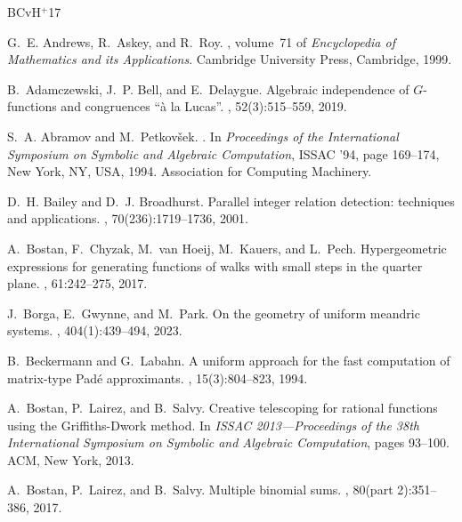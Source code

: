 \documentclass[12pt]{amsart}
\theoremstyle{plain}
\theoremstyle{remark}
\begin{document}
\newcommand{\etalchar}[1]{$^{#1}$}
\begin{thebibliography}{BCvH{\etalchar{+}}17}

G.~E. Andrews, R.~Askey, and R.~Roy.
, volume~71 of {\em Encyclopedia of
  Mathematics and its Applications}.
\newblock Cambridge University Press, Cambridge, 1999.

B.~Adamczewski, J.~P. Bell, and E.~Delaygue.
\newblock Algebraic independence of {$G$}-functions and congruences ``\`a la
  {L}ucas''.
, 52(3):515--559, 2019.

S.~A. Abramov and M.~Petkov\v{s}ek.
.
\newblock In {\em Proceedings of the International Symposium on Symbolic and
  Algebraic Computation}, ISSAC '94, page 169–174, New York, NY, USA, 1994.
  Association for Computing Machinery.

D.~H. Bailey and D.~J. Broadhurst.
\newblock Parallel integer relation detection: techniques and applications.
, 70(236):1719--1736, 2001.

\bibitem[BCvH{\etalchar{+}}17]{BoChHoKaPe17}
A.~Bostan, F.~Chyzak, M.~van Hoeij, M.~Kauers, and L.~Pech.
\newblock Hypergeometric expressions for generating functions of walks with
  small steps in the quarter plane.
, 61:242--275, 2017.

J.~Borga, E.~Gwynne, and M.~Park.
\newblock On the geometry of uniform meandric systems.
, 404(1):439--494, 2023.

B.~Beckermann and G.~Labahn.
\newblock A uniform approach for the fast computation of matrix-type {P}ad\'{e}
  approximants.
, 15(3):804--823, 1994.

A.~Bostan, P.~Lairez, and B.~Salvy.
\newblock Creative telescoping for rational functions using the
  {G}riffiths-{D}work method.
\newblock In {\em I{SSAC} 2013---{P}roceedings of the 38th {I}nternational
  {S}ymposium on {S}ymbolic and {A}lgebraic {C}omputation}, pages 93--100. ACM,
  New York, 2013.

A.~Bostan, P.~Lairez, and B.~Salvy.
\newblock Multiple binomial sums.
, 80(part 2):351--386, 2017.


\end{thebibliography}
\end{document}
